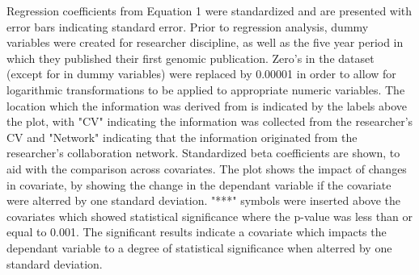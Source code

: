 \documentclass[10pt]{article}          %
\begin{document}
Regression coefficients from Equation 1 were standardized and are presented with error bars indicating standard error. Prior to regression analysis, dummy variables were created for researcher discipline, as well as the five year period in which they published their first genomic publication. Zero's in the dataset (except for in dummy variables) were replaced by 0.00001 in order to allow for logarithmic transformations to be applied to appropriate numeric variables. The location which the information was derived from is indicated by the labels above the plot, with "CV" indicating the information was collected from the researcher's CV and "Network" indicating that the information originated from the researcher's collaboration network. Standardized beta coefficients are shown, to aid with the comparison across covariates. The plot shows the impact of changes in covariate, by showing the change in the dependant variable if the covariate were alterred by one standard deviation. "***" symbols were inserted above the covariates which showed statistical significance where the p-value was less than or equal to 0.001. The significant results indicate a covariate which impacts the dependant variable to a degree of statistical significance when alterred by one standard deviation.

\newpage
\end{document}
